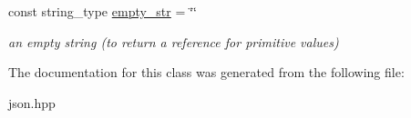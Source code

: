 \begin{DoxyCompactItemize}
\mbox{\label{classnlohmann_1_1detail_1_1iteration__proxy__value_a298dae04e3c0a64719752c16754d1d71}} 
const string\+\_\+type \mbox{\hyperlink{classnlohmann_1_1detail_1_1iteration__proxy__value_a298dae04e3c0a64719752c16754d1d71}{empty\+\_\+str}} = \char`\"{}\char`\"{}
\begin{DoxyCompactList}\small\item\em an empty string (to return a reference for primitive values) \end{DoxyCompactList}\end{DoxyCompactItemize}


The documentation for this class was generated from the following file\+:\begin{DoxyCompactItemize}
\item 
json.\+hpp\end{DoxyCompactItemize}
